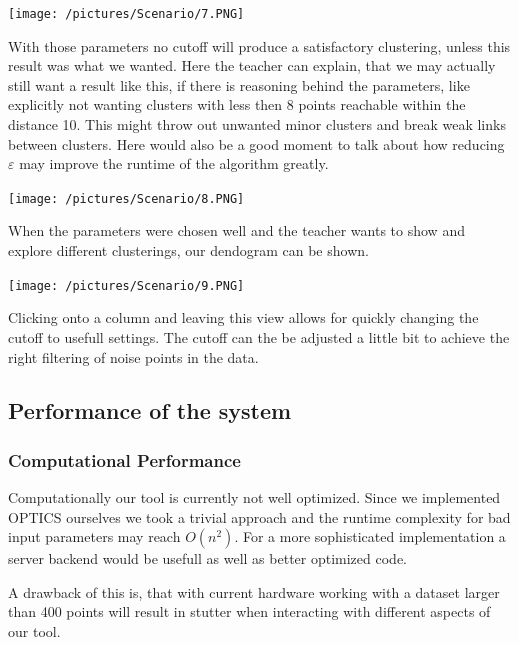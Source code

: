 \documentclass{vgtc}                          %
\begin{document}
\texttt{[image: /pictures/Scenario/7.PNG]}

With those parameters no cutoff will produce a satisfactory clustering, unless this result was what we wanted. Here the teacher can explain, that we may actually still want a result like this, if there is reasoning behind the parameters, like explicitly not wanting clusters with less then 8 points reachable within the distance 10. This might throw out unwanted minor clusters and break weak links between clusters. Here would also be a good moment to talk about how reducing  $\varepsilon$ may improve the runtime of the algorithm greatly.

\texttt{[image: /pictures/Scenario/8.PNG]}

When the parameters were chosen well and the teacher wants to show and explore different clusterings, our dendogram can be shown.

\texttt{[image: /pictures/Scenario/9.PNG]}

Clicking onto a column and leaving this view allows for quickly changing the cutoff to usefull settings. The cutoff can the be adjusted a little bit to achieve the right filtering of noise points in the data.

\subsection{Performance of the system}
\subsubsection{Computational Performance}

Computationally our tool is currently not well optimized. Since we implemented OPTICS ourselves we took a trivial approach and the runtime complexity for bad input parameters may reach $ O(n^{2}) $. For a more sophisticated implementation a server backend would be usefull as well as better optimized code.

A drawback of this is, that with current hardware working with a dataset larger than 400 points will result in stutter when interacting with different aspects of our tool.
\end{document}
